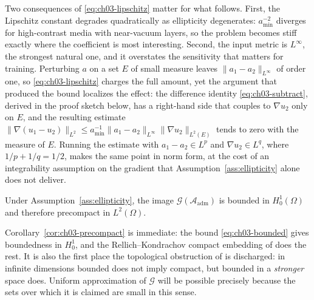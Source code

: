 Two consequences of \eqref{eq:ch03-lipschitz} matter for what follows. First,
the Lipschitz constant degrades quadratically as ellipticity degenerates:
$a_{\min}^{-2}$ diverges for high-contrast media with near-vacuum layers, so the
problem becomes stiff exactly where the coefficient is most interesting. Second,
the input metric is $L^\infty$, the strongest natural one, and it overstates the
sensitivity that matters for training. Perturbing $a$ on a set $E$ of small
measure leaves $\|a_1 - a_2\|_{L^\infty}$ of order one, so
\eqref{eq:ch03-lipschitz} charges the full amount, yet the argument that
produced the bound localizes the effect: the difference identity
\eqref{eq:ch03-subtract}, derived in the proof sketch below, has a right-hand
side that couples to $\nabla u_2$ only on $E$, and the resulting
estimate $\|\nabla(u_1-u_2)\|_{L^2} \le a_{\min}^{-1} \|a_1-a_2\|_{L^\infty}
\|\nabla u_2\|_{L^2(E)}$ tends to zero with the measure of $E$. Running the
estimate with $a_1 - a_2 \in L^p$ and $\nabla u_2 \in L^q$, where
$1/p + 1/q = 1/2$, makes the same point in norm form, at the cost of an
integrability assumption on the gradient that Assumption~\ref{ass:ellipticity}
alone does not deliver.

\begin{corollary}
\label{cor:ch03-precompact}
Under Assumption~\ref{ass:ellipticity}, the image
$\mathcal{G}(\mathcal{A}_{\text{adm}})$ is bounded in $H^1_0(\Omega)$ and
therefore precompact in $L^2(\Omega)$.
\end{corollary}

Corollary~\ref{cor:ch03-precompact} is immediate: the bound
\eqref{eq:ch03-bounded} gives boundedness in $H^1_0$, and the
Rellich--Kondrachov compact embedding
of
 does the rest. It
is also the first place the topological obstruction of
 is discharged: in
infinite dimensions bounded does not imply compact, but bounded in a
\emph{stronger} space does. Uniform approximation of $\mathcal{G}$ will be
possible precisely because the sets over which it is claimed are small in this
sense.


